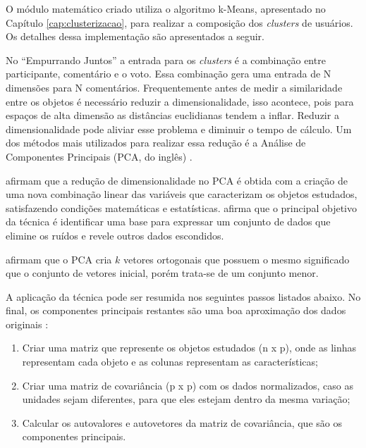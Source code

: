     O módulo matemático criado utiliza o algoritmo k-Means, apresentado no Capítulo \ref{cap:clusterizacao},
    para realizar a composição dos \textit{clusters} de usuários.
    Os detalhes dessa implementação são apresentados a seguir.

    No ``Empurrando Juntos'' a entrada para os \textit{clusters} é a combinação entre participante,  
    comentário e o voto. Essa combinação gera uma entrada de N dimensões para N comentários.
    Frequentemente antes de medir a similaridade entre os objetos é necessário
    reduzir a dimensionalidade, isso acontece, pois para espaços de alta dimensão as distâncias euclidianas
    tendem a inflar. Reduzir a dimensionalidade pode aliviar esse problema e diminuir o tempo de cálculo.
    Um dos métodos mais utilizados para realizar essa redução é a Análise de 
    Componentes Principais (PCA, do inglês) \cite{han2011data, sklearn}.

     afirmam que a redução de dimensionalidade no PCA é
    obtida com a criação de uma nova combinação linear das variáveis que caracterizam os
    objetos estudados, satisfazendo condições matemáticas e estatísticas.
     afirma que o principal objetivo da técnica é identificar
    uma base para expressar um conjunto de dados que elimine os ruídos e revele 
    outros dados escondidos.

     afirmam que o PCA 
    cria $k$ vetores ortogonais que possuem o mesmo significado que o conjunto
    de vetores inicial, porém trata-se de um conjunto menor. 

    A aplicação da técnica pode ser resumida nos seguintes passos listados abaixo.
    No final, os componentes principais restantes são uma boa aproximação dos 
    dados originais \cite{han2011data, mackiewicz1993principal, varella2008analise}: 

    \begin{enumerate}
      \item Criar uma matriz que represente os objetos estudados (n x p), onde as linhas representam cada objeto e as colunas representam as características;
      \item Criar uma matriz de covariância (p x p) com os dados normalizados, caso as unidades sejam diferentes,
	para que eles estejam dentro da mesma variação;
      \item Calcular os autovalores e autovetores da matriz de covariância, que 
      são os componentes principais.
    \end{enumerate}

